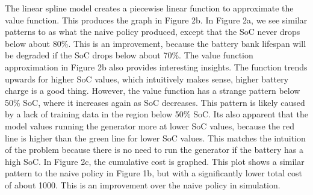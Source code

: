\documentclass{article}
\begin{document}
The linear spline model creates a piecewise linear function to approximate the value function. This produces the graph in Figure 2b. In Figure 2a, we see similar patterns to as what the naive policy produced, except that the SoC never drops below about 80\%. This is an improvement, because the battery bank lifespan will be degraded if the SoC drops below about 70\%. The value function approximation in Figure 2b also provides interesting insights. The function trends upwards for higher SoC values, which intuitively makes sense, higher battery charge is a good thing. However, the value function has a strange pattern below 50\% SoC, where it increases again as SoC decreases. This pattern is likely caused by a lack of training data in the region below 50\% SoC. Its also apparent that the model values running the generator more at lower SoC values, because the red line is higher than the green line for lower SoC values. This matches the intuition of the problem because there is no need to run the generator if the battery has a high SoC. In Figure 2c, the cumulative cost is graphed. This plot shows a similar pattern to the naive policy in Figure 1b, but with a significantly lower total cost of about 1000. This is an improvement over the naive policy in simulation.
\end{document}
